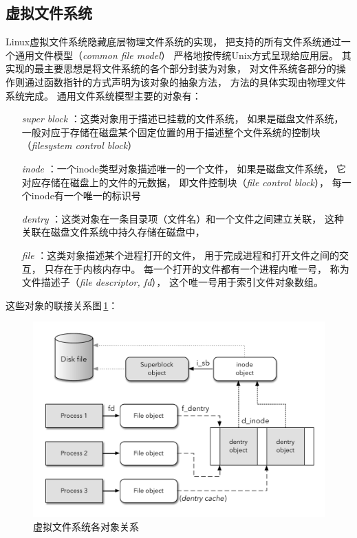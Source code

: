 \subsection{虚拟文件系统}
Linux虚拟文件系统隐藏底层物理文件系统的实现，
把支持的所有文件系统通过一个通用文件模型（{\em common file model}）
严格地按传统{\sc Unix}方式呈现给应用层。
其实现的最主要思想是将文件系统的各个部分封装为对象，
对文件系统各部分的操作则通过函数指针的方式声明为该对象的抽象方法，
方法的具体实现由物理文件系统完成。
通用文件系统模型主要的对象有：

\begin{itemize}
\item[{\em super block}]：这类对象用于描述已挂载的文件系统，
  如果是磁盘文件系统，
  一般对应于存储在磁盘某个固定位置的用于描述整个文件系统的控制块
  （{\em filesystem control block}）
\item[{\em inode}]：一个inode类型对象描述唯一的一个文件，
  如果是磁盘文件系统，
  它对应存储在磁盘上的文件的元数据，
  即文件控制块（{\em file control block}），
  每一个inode有一个唯一的标识号
\item[{\em dentry}]：这类对象在一条目录项（文件名）和一个文件之间建立关联，
  这种关联在磁盘文件系统中持久存储在磁盘中，
\item[{\em file}]：这类对象描述某个进程打开的文件，
  用于完成进程和打开文件之间的交互，
  只存在于内核内存中。
  每一个打开的文件都有一个进程内唯一号，
  称为文件描述子（{\em file descriptor, fd}），
  这个唯一号用于索引文件对象数组。
\end{itemize}

这些对象的联接关系图\,\ref{fig:vfs_obj}：
\begin{figure}[!ht]
  \centering
  \includegraphics[width=\textwidth]{fig/vfs_objects.pdf}
  \caption{虚拟文件系统各对象关系}
  \label{fig:vfs_obj}
\end{figure}

